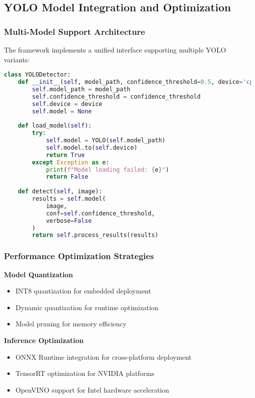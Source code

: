 \documentclass[11pt,a4paper]{article}
\begin{document}
\subsection{YOLO Model Integration and Optimization}

\subsubsection{Multi-Model Support Architecture}

The framework implements a unified interface supporting multiple YOLO variants:

\begin{lstlisting}[language=Python, caption=Unified YOLO Detector Interface]
class YOLODetector:
    def __init__(self, model_path, confidence_threshold=0.5, device='cpu'):
        self.model_path = model_path
        self.confidence_threshold = confidence_threshold
        self.device = device
        self.model = None
        
    def load_model(self):
        try:
            self.model = YOLO(self.model_path)
            self.model.to(self.device)
            return True
        except Exception as e:
            print(f"Model loading failed: {e}")
            return False
    
    def detect(self, image):
        results = self.model(
            image,
            conf=self.confidence_threshold,
            verbose=False
        )
        return self.process_results(results)
\end{lstlisting}

\subsubsection{Performance Optimization Strategies}

\textbf{Model Quantization}
\begin{itemize}
    \item INT8 quantization for embedded deployment
    \item Dynamic quantization for runtime optimization
    \item Model pruning for memory efficiency
\end{itemize}

\textbf{Inference Optimization}
\begin{itemize}
    \item ONNX Runtime integration for cross-platform deployment
    \item TensorRT optimization for NVIDIA platforms
    \item OpenVINO support for Intel hardware acceleration
\end{itemize}
\end{document}
